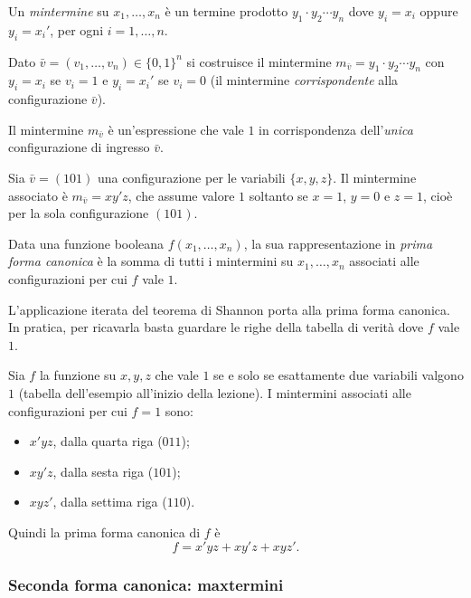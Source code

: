 \documentclass[11pt,a4paper]{article}
\begin{document}
\begin{definizione}[Mintermine]
Un \emph{mintermine} su $x_1, \dots, x_n$ è un termine prodotto
$y_1 \cdot y_2 \cdots y_n$ dove $y_i = x_i$ oppure $y_i = x_i'$, per ogni
$i = 1, \dots, n$.

Dato $\bar{v} = (v_1, \dots, v_n) \in \{0,1\}^n$ si costruisce il mintermine
$m_{\bar{v}} = y_1 \cdot y_2 \cdots y_n$ con $y_i = x_i$ se $v_i = 1$ e
$y_i = x_i'$ se $v_i = 0$ (il mintermine \emph{corrispondente} alla
configurazione $\bar{v}$).
\end{definizione}

Il mintermine $m_{\bar{v}}$ è un'espressione che vale $1$ in corrispondenza
dell'\emph{unica} configurazione di ingresso $\bar{v}$.

\begin{esempio}
Sia $\bar{v} = (101)$ una configurazione per le variabili $\{x,y,z\}$. Il
mintermine associato è $m_{\bar{v}} = xy'z$, che assume valore $1$ soltanto se
$x = 1$, $y = 0$ e $z = 1$, cioè per la sola configurazione $(101)$.
\end{esempio}

\begin{definizione}
Data una funzione booleana $f(x_1, \dots, x_n)$, la sua rappresentazione in
\emph{prima forma canonica} è la somma di tutti i mintermini su
$x_1, \dots, x_n$ associati alle configurazioni per cui $f$ vale $1$.
\end{definizione}

L'applicazione iterata del teorema di Shannon porta alla prima forma canonica.
In pratica, per ricavarla basta guardare le righe della tabella di verità dove
$f$ vale $1$.

\begin{esempio}
Sia $f$ la funzione su $x, y, z$ che vale $1$ se e solo se esattamente due
variabili valgono $1$ (tabella dell'esempio all'inizio della lezione). I mintermini associati alle
configurazioni per cui $f = 1$ sono:
\begin{itemize}
    \item $x'yz$, dalla quarta riga ($011$);
    \item $xy'z$, dalla sesta riga ($101$);
    \item $xyz'$, dalla settima riga ($110$).
\end{itemize}
Quindi la prima forma canonica di $f$ è
\[
  f = x'yz + xy'z + xyz' .
\]
\end{esempio}

\subsubsection{Seconda forma canonica: maxtermini}
\end{document}
